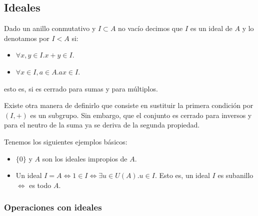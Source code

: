 \subsection{Ideales}

\begin{definition}
Dado un anillo conmutativo y $I \subset A$ no vacío decimos que $I$ es un ideal de $A$ y lo denotamos por $I < A$ si:

\begin{itemize}
\item $\forall x,y \in I. x + y \in I$.
\item $\forall x \in I,a \in A. ax \in I$. 
\end{itemize}

esto es, si es cerrado para sumas y para múltiplos.
\end{definition}

Existe otra manera de definirlo que consiste en sustituir la primera condición por $(I,+)$ es un subgrupo. Sin embargo, que el conjunto es cerrado para inversos y para el neutro de la suma ya se deriva de la segunda propiedad. 

\begin{example}
Tenemos los siguientes ejemplos básicos:

\begin{itemize}
\item $\{0\}$ y $A$ son los ideales impropios de $A$. 
\item Un ideal $I = A \iff 1 \in I \iff \exists u \in U(A).u \in I$. Esto es, un ideal $I$ es subanillo $\iff$ es todo $A$. 
\end{itemize}
\end{example}

\subsubsection{Operaciones con ideales}

